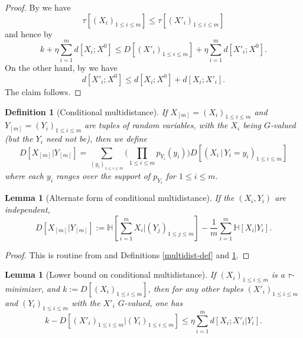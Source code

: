 \documentclass[10pt,a4paper]{article}
\newtheorem{lemma}[theorem]{Lemma}
\newtheorem{definition}[theorem]{Definition}
\newcommand{\lean}[1]{}
\newcommand{\uses}[1]{}
\newcommand{\leanok}{}
\newcommand{\bbH}{\mathbb{H}}
\begin{document}
\begin{proof}\uses{tau-min-multi, ruzsa-triangle}\leanok
  By  we have
  $$ \tau[ (X_i)_{1 \leq i \leq m}] \leq \tau[ (X'_i)_{1 \leq i \leq m}]$$
  and hence by 
  $$ k + \eta \sum_{i=1}^m d[X_i; X^0] \leq D[(X'_i)_{1 \leq i \leq m}] + \eta \sum_{i=1}^m d[X'_i; X^0].$$
  On the other hand, by  we have
  $$ d[X'_i; X^0] \leq d[X_i; X^0] + d[X_i; X'_i].$$
  The claim follows.
\end{proof}

\begin{definition}[Conditional multidistance]\label{cond-multidist-def}\uses{multidist-def}\lean{condMultiDist}
  \leanok If $X_{[m]} = (X_i)_{1 \leq i \leq m}$ and $Y_{[m]} = (Y_i)_{1 \leq i \leq m}$ are tuples of random variables, with the $X_i$ being $G$-valued (but the $Y_i$ need not be), then we define
  \begin{equation}\label{multi-def-cond-alt}
    D[ X_{[m]} | Y_{[m]} ] = \sum_{(y_i)_{1 \leq i \leq m}} \biggl(\prod_{1 \leq i \leq m} p_{Y_i}(y_i)\biggr) D[ (X_i \,|\, Y_i \mathop{=}y_i)_{1 \leq i \leq m}]
  \end{equation}
  where each $y_i$ ranges over the support of $p_{Y_i}$ for $1 \leq i \leq m$.
\end{definition}

\begin{lemma}[Alternate form of conditional multidistance]\label{cond-multidist-alt}\lean{condMultiDist_eq}\leanok
If the $(X_i,Y_i)$ are independent,
  \begin{equation}\label{multi-def-cond}
  D[ X_{[m]} | Y_{[m]}] := \bbH[\sum_{i=1}^m X_i \big| (Y_j)_{1 \leq j \leq m} ] - \frac{1}{m} \sum_{i=1}^m \bbH[ X_i | Y_i].
    \end{equation}
\end{lemma}

\begin{proof}\uses{conditional-entropy-def, multidist-def, cond-multidist-def}\leanok
  This is routine from  and Definitions \ref{multidist-def} and \ref{cond-multidist-def}.
\end{proof}



\begin{lemma}[Lower bound on conditional multidistance]\label{cond-multidist-lower}\lean{sub_condMultiDistance_le}\leanok  If  $(X_i)_{1 \leq i \leq m}$ is a $\tau$-minimizer, and $k := D[(X_i)_{1 \leq i \leq m}]$, then for any other tuples $(X'_i)_{1 \leq i \leq m}$ and $(Y_i)_{1 \leq i \leq m}$ with the $X'_i$ $G$-valued, one has
  $$ k - D[(X'_i)_{1 \leq i \leq m} | (Y_i)_{1 \leq i \leq m}] \leq \eta \sum_{i=1}^m d[X_i; X'_i|Y_i].$$
\end{lemma}
\end{document}
